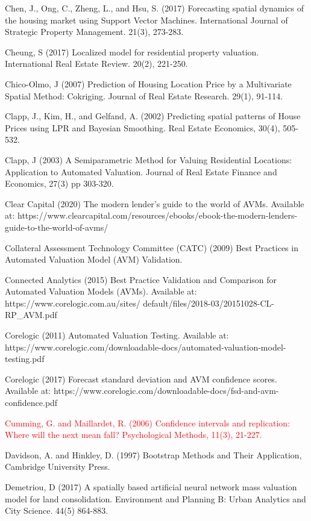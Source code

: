\documentclass[colTwo]{anon}
\theoremstyle{definition}
\begin{document}
\begin{thebibliography}{50}
\harvarditem{}{}{}Chen, J., Ong, C., Zheng, L., and Hsu, S. (2017) Forecasting spatial dynamics of the housing market using Support Vector Machines. International Journal of Strategic Property Management. 21(3), 273-283. 

\harvarditem{}{}{}Cheung, S (2017) Localized model for residential property valuation. International Real Estate Review. 20(2), 221-250. 

\harvarditem{}{}{}Chico-Olmo, J (2007) Prediction of Housing Location Price by a Multivariate Spatial Method: Cokriging. Journal of Real Estate Research. 29(1), 91-114. 

\harvarditem{}{}{}Clapp, J., Kim, H., and Gelfand, A. (2002) Predicting spatial patterns of House Prices using LPR and Bayesian Smoothing. Real Estate Economics, 30(4), 505-532. 

\harvarditem{}{}{}Clapp, J (2003) A Semiparametric Method for Valuing Residential Locations: Application to Automated Valuation. Journal of Real Estate Finance and Economics, 27(3) pp 303-320. 

\harvarditem{}{}{}Clear Capital (2020) The modern lender’s guide to the world of AVMs. Available at: https://www.clearcapital.com/resources/ebooks/ebook-the-modern-lenders-guide-to-the-world-of-avms/

\harvarditem{}{}{}Collateral Assessment Technology Committee (CATC) (2009) Best Practices in Automated Valuation Model (AVM) Validation. 

\harvarditem{}{}{}Connected Analytics (2015) Best Practice Validation and Comparison for Automated Valuation Models (AVMs). Available at: https://www.corelogic.com.au/sites/ default/files/2018-03/20151028-CL-RP\_AVM.pdf

\harvarditem{}{}{}Corelogic (2011) Automated Valuation Testing. Available at: https://www.corelogic.com/downloadable-docs/automated-valuation-model-testing.pdf
		
\harvarditem{}{}{}Corelogic (2017) Forecast standard deviation and AVM confidence scores. Available at: https://www.corelogic.com/downloadable-docs/fsd-and-avm-confidence.pdf

\textcolor{red}{\harvarditem{}{}{} Cumming, G. and Maillardet, R. (2006) Confidence intervals and replication: Where will the next mean fall? Psychological Methods, 11(3), 21-227.} 

\harvarditem{}{}{}Davidson, A. and Hinkley, D. (1997) Bootstrap Methods and Their Application, Cambridge University Press.  

\harvarditem{}{}{}Demetriou, D (2017) A spatially based artificial neural network mass valuation model for land consolidation. Environment and Planning B: Urban Analytics and City Science. 44(5) 864-883. 


\end{thebibliography}
\end{document}
